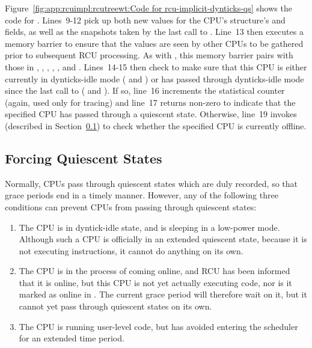 Figure~\ref{fig:app:rcuimpl:rcutreewt:Code for rcu-implicit-dynticks-qs}
shows the code for .
Lines~9-12 pick up both new values for the CPU's 
structure's  and  fields, as well
as the snapshots taken by the last call to
.
Line~13 then executes a memory barrier to ensure that the values are
seen by other CPUs to be gathered prior to subsequent RCU processing.
As with , this memory barrier
pairs with those in ,
, , ,
, and .
Lines~14-15 then check to make sure that this CPU is either currently
in dynticks-idle mode ( and
) or has passed through dynticks-idle mode
since the last call to 
( and ).
If so, line~16 increments the  statistical
counter (again, used only for tracing) and line~17 returns non-zero
to indicate that the specified CPU has passed through a quiescent state.
Otherwise, line~19 invokes 
(described in Section~\ref{app:rcuimpl:rcutreewt:Forcing Quiescent States})
to check whether the specified CPU is currently offline.
\fi

\subsection{Forcing Quiescent States}
\label{app:rcuimpl:rcutreewt:Forcing Quiescent States}

Normally, CPUs pass through quiescent states which are duly recorded,
so that grace periods end in a timely manner.
However, any of the following three conditions can prevent CPUs from
passing through quiescent states:

\begin{enumerate}
\item	The CPU is in dyntick-idle state, and is sleeping in a low-power
	mode.
	Although such a CPU is officially in an extended quiescent state,
	because it is not executing instructions, it cannot do anything
	on its own.
\item	The CPU is in the process of coming online, and RCU has been
	informed that it is online, but this CPU is not yet actually
	executing code, nor is it marked as online in .
	The current grace period will therefore wait on it, but it cannot
	yet pass through quiescent states on its own.
\item	The CPU is running user-level code, but has avoided
	entering the scheduler for an extended time period.
\end{enumerate}

